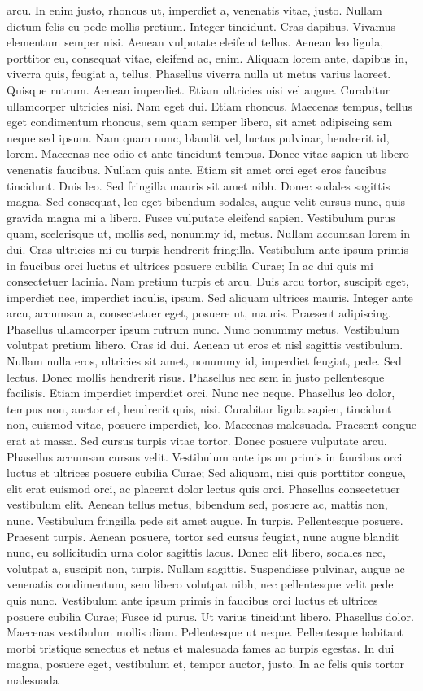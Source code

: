 arcu. In enim justo, rhoncus ut, imperdiet a, venenatis vitae, justo. Nullam dictum felis eu pede mollis pretium. Integer tincidunt. Cras dapibus. Vivamus elementum semper nisi. Aenean vulputate eleifend tellus. Aenean leo ligula, porttitor eu, consequat vitae, eleifend ac, enim. Aliquam lorem ante, dapibus in, viverra quis, feugiat a, tellus. Phasellus viverra nulla ut metus varius laoreet. Quisque rutrum. Aenean imperdiet. Etiam ultricies nisi vel augue. Curabitur ullamcorper ultricies nisi. Nam eget dui. Etiam rhoncus. Maecenas tempus, tellus eget condimentum rhoncus, sem quam semper libero, sit amet adipiscing sem neque sed ipsum. Nam quam nunc, blandit vel, luctus pulvinar, hendrerit id, lorem. Maecenas nec odio et ante tincidunt tempus. Donec vitae sapien ut libero venenatis faucibus. Nullam quis ante. Etiam sit amet orci eget eros faucibus tincidunt. Duis leo. Sed fringilla mauris sit amet nibh. Donec sodales sagittis magna. Sed consequat, leo eget bibendum sodales, augue velit cursus nunc, quis gravida magna mi a libero. Fusce vulputate eleifend sapien. Vestibulum purus quam, scelerisque ut, mollis sed, nonummy id, metus. Nullam accumsan lorem in dui. Cras ultricies mi eu turpis hendrerit fringilla. Vestibulum ante ipsum primis in faucibus orci luctus et ultrices posuere cubilia Curae; In ac dui quis mi consectetuer lacinia. Nam pretium turpis et arcu. Duis arcu tortor, suscipit eget, imperdiet nec, imperdiet iaculis, ipsum. Sed aliquam ultrices mauris. Integer ante arcu, accumsan a, consectetuer eget, posuere ut, mauris. Praesent adipiscing. Phasellus ullamcorper ipsum rutrum nunc. Nunc nonummy metus. Vestibulum volutpat pretium libero. Cras id dui. Aenean ut eros et nisl sagittis vestibulum. Nullam nulla eros, ultricies sit amet, nonummy id, imperdiet feugiat, pede. Sed lectus. Donec mollis hendrerit risus. Phasellus nec sem in justo pellentesque facilisis. Etiam imperdiet imperdiet orci. Nunc nec neque. Phasellus leo dolor, tempus non, auctor et, hendrerit quis, nisi. Curabitur ligula sapien, tincidunt non, euismod vitae, posuere imperdiet, leo. Maecenas malesuada. Praesent congue erat at massa. Sed cursus turpis vitae tortor. Donec posuere vulputate arcu. Phasellus accumsan cursus velit. Vestibulum ante ipsum primis in faucibus orci luctus et ultrices posuere cubilia Curae; Sed aliquam, nisi quis porttitor congue, elit erat euismod orci, ac placerat dolor lectus quis orci. Phasellus consectetuer vestibulum elit. Aenean tellus metus, bibendum sed, posuere ac, mattis non, nunc. Vestibulum fringilla pede sit amet augue. In turpis. Pellentesque posuere. Praesent turpis. Aenean posuere, tortor sed cursus feugiat, nunc augue blandit nunc, eu sollicitudin urna dolor sagittis lacus. Donec elit libero, sodales nec, volutpat a, suscipit non, turpis. Nullam sagittis. Suspendisse pulvinar, augue ac venenatis condimentum, sem libero volutpat nibh, nec pellentesque velit pede quis nunc. Vestibulum ante ipsum primis in faucibus orci luctus et ultrices posuere cubilia Curae; Fusce id purus. Ut varius tincidunt libero. Phasellus dolor. Maecenas vestibulum mollis diam. Pellentesque ut neque. Pellentesque habitant morbi tristique senectus et netus et malesuada fames ac turpis egestas. In dui magna, posuere eget, vestibulum et, tempor auctor, justo. In ac felis quis tortor malesuada 